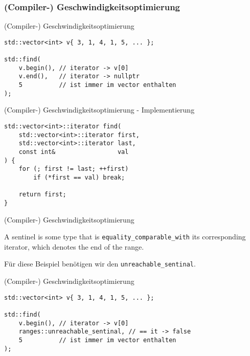 \subsubsection{(Compiler-) Geschwindigkeitsoptimierung}

\begin{frame}[fragile]{(Compiler-) Geschwindigkeitsoptimierung}
    \begin{verbatim}
std::vector<int> v{ 3, 1, 4, 1, 5, ... };

std::find(
    v.begin(), // iterator -> v[0]
    v.end(),   // iterator -> nullptr
    5          // ist immer im vector enthalten
);
    \end{verbatim}
\end{frame}

\begin{frame}[fragile]{(Compiler-) Geschwindigkeitsoptimierung - Implementierung}
    \begin{verbatim}
std::vector<int>::iterator find(
    std::vector<int>::iterator first,
    std::vector<int>::iterator last,
    const int&                 val
) {
    for (; first != last; ++first)
        if (*first == val) break;
    
    return first;
}
    \end{verbatim}
\end{frame}

\begin{frame}{(Compiler-) Geschwindigkeitsoptimierung}
    \begin{center}
        A sentinel is some type that is \texttt{equality\_comparable\_with} its corresponding iterator, which denotes the end of the range.

        \vspace{2.5em}

        Für diese Beispiel benötigen wir den \texttt{unreachable\_sentinal}.
    \end{center}
\end{frame}

\begin{frame}[fragile]{(Compiler-) Geschwindigkeitsoptimierung}
    \begin{verbatim}
std::vector<int> v{ 3, 1, 4, 1, 5, ... };

std::find(
    v.begin(), // iterator -> v[0]
    ranges::unreachable_sentinal, // == it -> false
    5          // ist immer im vector enthalten
);
    \end{verbatim}
\end{frame}

